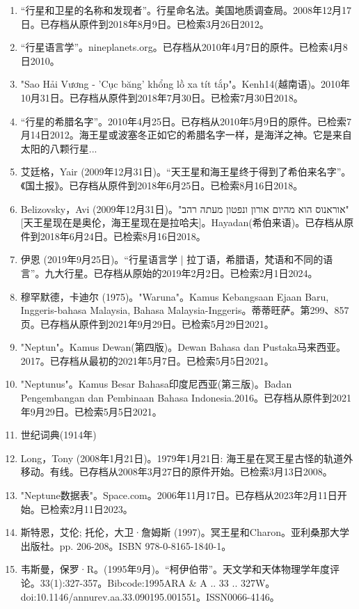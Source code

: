 \begin{enumerate}
\item “行星和卫星的名称和发现者”。行星命名法。美国地质调查局。2008年12月17日。已存档从原件到2018年8月9日。已检索3月26日2012。
\item “行星语言学”。nineplanets.org。已存档从2010年4月7日的原件。已检索4月8日2010。
\item "Sao Hải Vương - 'Cục băng' khổng lồ xa tít tắp"。Kenh14(越南语)。2010年10月31日。已存档从原件到2018年7月30日。已检索7月30日2018。
\item “行星的希腊名字”。2010年4月25日。已存档从2010年5月9日的原件。已检索7月14日2012。海王星或波塞冬正如它的希腊名字一样，是海洋之神。它是来自太阳的八颗行星...
\item 艾廷格，Yair (2009年12月31日)。“天王星和海王星终于得到了希伯来名字”。《国土报》。已存档从原件到2018年6月25日。已检索8月16日2018。
\item Belizovsky，Avi (2009年12月31日)。"אוראנוס הוא מהיום אורון ונפטון מעתה רהב"[天王星现在是奥伦，海王星现在是拉哈夫]。Hayadan(希伯来语)。已存档从原件到2018年6月24日。已检索8月16日2018。
\item 伊恩 (2019年9月25日)。“行星语言学 | 拉丁语，希腊语，梵语和不同的语言”。九大行星。已存档从原始的2019年2月2日。已检索2月1日2024。
\item 穆罕默德，卡迪尔 (1975)。"Waruna"。Kamus Kebangsaan Ejaan Baru, Inggeris-bahasa Malaysia, Bahasa Malaysia-Inggeris。蒂蒂旺萨。第299、857页。已存档从原件到2021年9月29日。已检索5月29日2021。
\item "Neptun"。Kamus Dewan(第四版)。Dewan Bahasa dan Pustaka马来西亚。2017。已存档从最初的2021年5月7日。已检索5月5日2021。
\item "Neptunus"。Kamus Besar Bahasa印度尼西亚(第三版)。Badan Pengembangan dan Pembinaan Bahasa Indonesia.2016。已存档从原件到2021年9月29日。已检索5月5日2021。
\item 世纪词典(1914年)
\item Long，Tony (2008年1月21日)。1979年1月21日: 海王星在冥王星古怪的轨道外移动。有线。已存档从2008年3月27日的原件开始。已检索3月13日2008。
\item "Neptune数据表"。Space.com。2006年11月17日。已存档从2023年2月11日开始。已检索2月11日2023。
\item 斯特恩，艾伦; 托伦，大卫·詹姆斯 (1997)。冥王星和Charon。亚利桑那大学出版社。pp. 206-208。ISBN 978-0-8165-1840-1。
\item 韦斯曼，保罗·R。(1995年9月)。“柯伊伯带”。天文学和天体物理学年度评论。33(1):327-357。Bibcode:1995ARA & A .. 33 .. 327W。doi:10.1146/annurev.aa.33.090195.001551。ISSN0066-4146。 

\end{enumerate}
